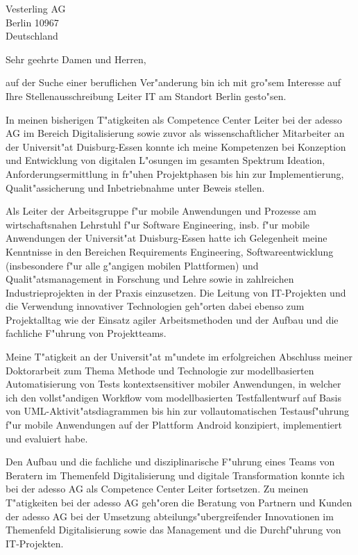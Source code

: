 \documentclass[11pt,a4paper]{dinbrief}
\date{\today}
\begin{document}
 
\begin{letter}  
{%
	Vesterling AG\\
	Berlin 10967\\
	Deutschland
}
\subject{\bf Bewerbung Leiter IT}
\opening{Sehr geehrte Damen und Herren,}
auf der Suche einer beruflichen Ver"anderung bin ich mit gro"sem Interesse auf Ihre Stellenausschreibung Leiter IT am Standort Berlin gesto"sen. 

In meinen bisherigen T"atigkeiten als Competence Center Leiter bei der adesso AG im Bereich Digitalisierung sowie zuvor als wissenschaftlicher Mitarbeiter an der Universit"at Duisburg-Essen konnte ich meine Kompetenzen bei Konzeption und Entwicklung von digitalen L"osungen im gesamten Spektrum Ideation, Anforderungsermittlung in fr"uhen Projektphasen bis hin zur Implementierung, Qualit"assicherung und Inbetriebnahme unter Beweis stellen.

Als Leiter der Arbeitsgruppe f"ur mobile Anwendungen und Prozesse am wirtschaftsnahen Lehrstuhl f"ur Software Engineering, insb. f"ur mobile Anwendungen der Universit"at Duisburg-Essen hatte ich Gelegenheit meine Kenntnisse in den Bereichen Requirements Engineering, Softwareentwicklung (insbesondere f"ur alle g"angigen mobilen Plattformen) und Qualit"atsmanagement in Forschung und Lehre sowie in zahlreichen Industrieprojekten in der Praxis einzusetzen. Die Leitung von IT-Projekten und die Verwendung innovativer Technologien geh"orten dabei ebenso zum Projektalltag wie der Einsatz agiler Arbeitsmethoden und der Aufbau und die fachliche  F"uhrung von Projektteams.

Meine T"atigkeit an der Universit"at m"undete im erfolgreichen Abschluss meiner Doktor\-arbeit zum Thema Methode und Technologie zur modellbasierten Automatisierung von Tests kontextsensitiver mobiler Anwendungen, in welcher ich den vollst"andigen Workflow vom modellbasierten Testfallentwurf auf Basis von UML-Aktivit"atsdiagrammen bis hin zur vollautomatischen Testausf"uhrung f"ur mobile Anwendungen auf der Plattform Android konzipiert, implementiert und evaluiert habe.

\clearpage
Den Aufbau und die fachliche und disziplinarische F"uhrung eines Teams von Beratern im Themenfeld Digitalisierung und digitale Transformation konnte ich bei der adesso AG als Competence Center Leiter fortsetzen. Zu meinen T"atigkeiten bei der adesso AG geh"oren die Beratung von Partnern und Kunden der adesso AG bei der Umsetzung abteilungs"ubergreifender Innovationen im Themenfeld Digitalisierung sowie das Management und die Durchf"uhrung von IT-Projekten.


\end{letter}
\end{document}
